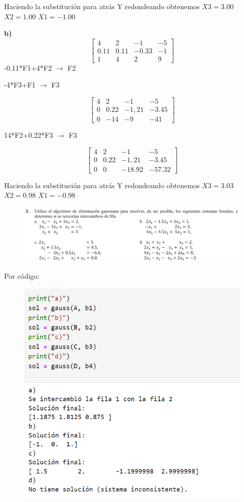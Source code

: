 \documentclass[12pt]{article}
\begin{document}
Haciendo la substitución para atrás Y redondeando obtenemos
$X3 = 3.00$    $X2 =1.00$  $X1 =-1.00$ 

\textbf{b)}
\[
\begin{bmatrix}
4 & 2 & -1 & -5 \\
0.11 & 0.11 & -0.33 & -1 \\
1 & 4 & 2 & 9
\end{bmatrix}
\]
-0.11*F1+4*F2 $\longrightarrow $ F2

-4*F3+F1 $\longrightarrow $ F3

\[
\begin{bmatrix}
4 & 2 & -1 & -5 \\
0 & 0.22 & -1,21& -3.45 \\
0 & -14 & -9 & -41
\end{bmatrix}
\]

14*F2+0.22*F3 $\longrightarrow $ F3

\[
\begin{bmatrix}
4 & 2 & -1 & -5 \\
0 & 0.22 & -1,21& -3.45 \\
0 & 0 & -18.92 & -57.32
\end{bmatrix}
\]

Haciendo la substitución para atrás Y redondeando obtenemos
$X3 = 3.03$    $X2 =0.98$  $X1 =-0.98$ 


\begin{figure}[H]
\includegraphics[width=1\textwidth]{./inFiles/Figures/Ej3.png}
\end{figure}

Por código:
\begin{figure}[H]
\includegraphics[width=1\textwidth]{./inFiles/Figures/PC3.png}
\end{figure}
\end{document}
